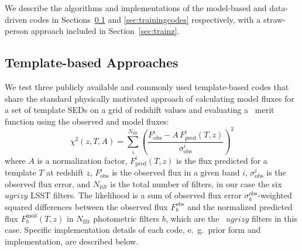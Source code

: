 We describe the algorithms and implementations of the model-based and data-driven codes in Sections~\ref{sec:templatecodes} and \ref{sec:trainingcodes} respectively, with a straw-person approach included in Section~\ref{sec:trainz}.
%
%

\subsection{Template-based Approaches}
\label{sec:templatecodes}

We test three publicly available and commonly used template-based codes that share the standard physically motivated approach of calculating model fluxes for a set of template SEDs on a grid of redshift values and evaluating a \chisq\ merit function using the observed and model fluxes:
\begin{equation} \label{eq_temp_chi}
\chi^{2}(z,T,A) = \sum_{i}^{N_{\mathrm{filt}}}\left(\frac{F^{i}_{\mathrm{obs}} - A \, F^{i}_{\mathrm{pred}}(T,z)}{\sigma^{i}_{\mathrm{obs}}}\right)^2
\end{equation}
\noindent where $A$ is a normalization factor, $F^i_{\mathrm{pred}}(T,z)$ is the flux predicted for a template $T$ at redshift $z$, $F^i_{\mathrm{obs}}$ is the observed flux in a given band $i$, $\sigma^i_{\mathrm{obs}}$ is the observed flux error, and $N_{\mathrm filt}$ is the total number of filters, in our case the six $ugrizy$ LSST filters.
The likelihood is a sum of observed flux error $\sigma_{b}^{\mathrm{obs}}$-weighted squared differences between the observed flux $F^{\mathrm{obs}}_{b}$ and the normalized predicted flux $F^{\mathrm{mod}}_{b}(T, z)$ in $N_{\mathrm{filt}}$ photometric filters $b$, which are the \lsst\ $ugrizy$ filters in this case.
Specific implementation details of each code, e.~g.~prior form and implementation, are described below.

